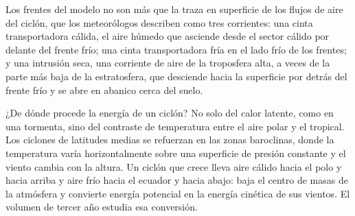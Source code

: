 \begin{omfigure}
\par{}
\end{omfigure}

Los frentes del modelo no son más que la traza en superficie de los flujos de aire del ciclón, que los
meteorólogos describen como tres corrientes: una cinta transportadora cálida, el aire húmedo que asciende desde el
sector cálido por delante del frente frío; una cinta transportadora fría en el lado frío de los frentes; y una
intrusión seca, una corriente de aire de la troposfera alta, a veces de la parte más baja de la
estratosfera, que desciende hacia la superficie por detrás del frente frío y se abre en abanico cerca del
suelo.

¿De dónde procede la energía de un ciclón? No solo del calor latente, como en una tormenta,
sino del contraste de temperatura entre el aire polar y el tropical. Los ciclones de latitudes medias
se refuerzan en las zonas baroclinas, donde la temperatura varía horizontalmente sobre una superficie de
presión constante y el viento cambia con la altura. Un ciclón que crece lleva aire cálido hacia el polo
y hacia arriba y aire frío hacia el ecuador y hacia abajo: baja el centro de masas de la
atmósfera y convierte energía potencial en la energía cinética de sus vientos. El volumen de
tercer año estudia esa conversión.

